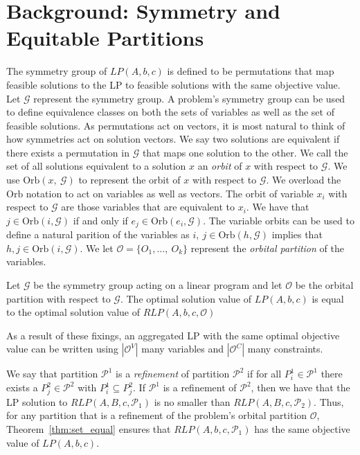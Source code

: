 \documentclass[runningheads]{llncs}
\newcommand{\cP}{{\mathcal P}}
\newcommand{\cG}{{\mathcal G}}
\newcommand{\cO}{{\mathcal O}}
\begin{document}
\section{Background: Symmetry and Equitable Partitions}



The symmetry group of $LP(A,b,c)$ is defined to
be permutations that map feasible solutions to the LP to feasible solutions with
the same objective value. Let $\cG$ represent the symmetry group. A problem's
symmetry group can be used to define equivalence classes on both the sets of
variables as well as the set of feasible solutions. As permutations act on
vectors, it is most natural to think of how symmetries act on solution vectors.
We say two solutions are equivalent if there exists a permutation in $\cG$ that
maps one solution to the other. We call the set of all solutions equivalent to a
solution $x$ an {\em orbit} of $x$ with respect to $\cG$. We use
$\mbox{Orb}(x,\ \cG)$ to represent the orbit of $x$ with respect to $\cG$. We
overload the $\mbox{Orb}$ notation to act on variables as well as vectors. The
orbit of variable $x_i$ with respect to $\cG$ are those variables that are
equivalent to $x_i$. We have that $j \in \mbox{Orb}(i,\cG)$ if and only if $e_j
\in \mbox{Orb}(e_i,\cG)$. The variable orbits can be used to define a natural
parition of the variables as $i,\ j \in \mbox{Orb}(h,\cG)$ implies that $h, j
\in \mbox{Orb}(i,\cG)$. We let $\cO= \{O_1,\ldots,\ O_k\}$ represent the {\em orbital
partition} of the variables. 

\begin{theorem} \label{thm:set_equal}
Let $\cG$ be the symmetry group acting on a linear program and let $\cO$ be the
orbital partition with respect to $\cG$. The optimal solution
value of $LP(A,b,c)$ is equal to the optimal solution value of $RLP(A,b,c, \cO)$
\end{theorem}


\begin{corollary}
As a result of these fixings, an aggregated LP with the same optimal objective
value can be written using $|\cO^V|$ many variables and $|\cO^C|$ many constraints.
  \end{corollary}

We say that partition $\cP^1$ is a {\em refinement} of partition $\cP^2$ if for
all $P_i^1 \in \cP^1$ there exists a $P_j^2 \in \cP^2$ with $P_i^1 \subseteq
P_j^2$. If $\cP^1$ is a refinement of $\cP^2$, then we have that the LP solution
to $RLP(A,B,c,\cP_1)$ is no smaller than $RLP(A,B,c,\cP_2)$. Thus, for any
partition that is a refinement of the problem's orbital partition $\cO$,
Theorem~\ref{thm:set_equal} ensures that $RLP(A,b,c,\cP_1)$ has the same
objective value of $LP(A,b,c)$.
\end{document}
